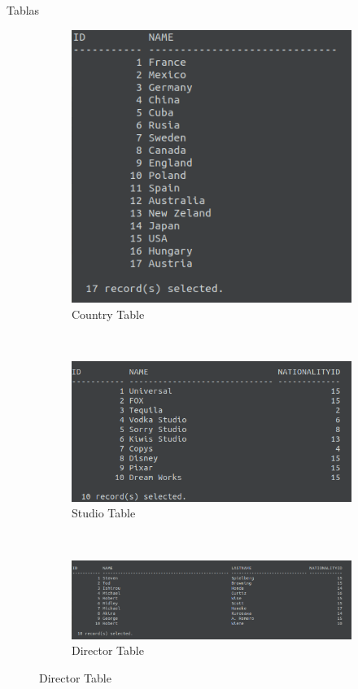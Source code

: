 \documentclass{beamer}%
\begin{document}
\begin{frame}{Tablas}
\begin{figure}
    \centering
    \begin{subfigure}[b]{0.3\textwidth}
        \includegraphics[scale=0.2]{figures/screenshot_country_data.png}
        \caption{Country Table}

    \end{subfigure}
    ~ %
    \begin{subfigure}[b]{0.4\textwidth}
        \includegraphics[scale=0.2]{figures/screenshot_studio_data.png}
        \caption{Studio Table}

    \end{subfigure}
    ~ %
    \begin{subfigure}[b]{0.3\textwidth}
        \includegraphics[scale=0.2]{figures/screenshot_director_data.png}
        \caption{Director Table}


\end{subfigure}
\end{figure}
\end{frame}
\end{document}
